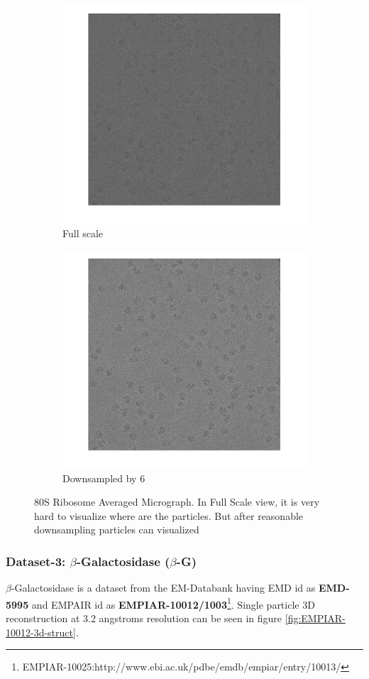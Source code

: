 \documentclass[twoside]{iitbreport}
\begin{document}
\begin{figure}[h]
\centering
\begin{subfigure}{.5\linewidth}
\centering
\includegraphics[width=0.5\linewidth]{EM-10028-micrograph-full_micrograph}
\captionsetup{justification=centering}
\caption{ Full scale }
\end{subfigure} 
\begin{subfigure}{.48\linewidth}
\centering
\includegraphics[width=0.5\linewidth]{EM-10028-micrograph-full-down-6_micrograph}
\captionsetup{justification=centering}
\caption{Downsampled by 6}
\end{subfigure}
\captionsetup{justification=centering}
\caption{80S Ribosome Averaged Micrograph. In Full Scale view, it is very hard to visualize where are the particles. But after reasonable downsampling particles can  visualized}
\label{fig:EM-10028-Avg-micrograph}
\end{figure}


\subsubsection{Dataset-3: $\beta$-Galactosidase ($\beta$-G)}\label{subsec:B-Galactosidas}

$\beta$-Galactosidase is a dataset from the EM-Databank having EMD id as \textbf{EMD-5995} and EMPAIR id as \textbf{EMPIAR-10012/1003}\footnote{\label{fn:EMPIAR-10025-2}EMPIAR-10025:http://www.ebi.ac.uk/pdbe/emdb/empiar/entry/10013/}. Single particle 3D reconstruction at 3.2 angstroms resolution can be seen in figure \ref{fig:EMPIAR-10012-3d-struct}.
\end{document}
